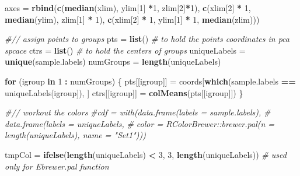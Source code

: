 \documentclass[]{article}
\newenvironment{Shaded}{\begin{snugshade}}{\end{snugshade}}
\newcommand{\KeywordTok}[1]{\textcolor[rgb]{0.13,0.29,0.53}{\textbf{#1}}}
\newcommand{\DecValTok}[1]{\textcolor[rgb]{0.00,0.00,0.81}{#1}}
\newcommand{\StringTok}[1]{\textcolor[rgb]{0.31,0.60,0.02}{#1}}
\newcommand{\CommentTok}[1]{\textcolor[rgb]{0.56,0.35,0.01}{\textit{#1}}}
\newcommand{\ControlFlowTok}[1]{\textcolor[rgb]{0.13,0.29,0.53}{\textbf{#1}}}
\newcommand{\OperatorTok}[1]{\textcolor[rgb]{0.81,0.36,0.00}{\textbf{#1}}}
\newcommand{\NormalTok}[1]{#1}
\begin{document}
\begin{Shaded}
\begin{Highlighting}[]
\NormalTok{       axes                          =}\StringTok{ }\KeywordTok{rbind}\NormalTok{(}\KeywordTok{c}\NormalTok{(}\KeywordTok{median}\NormalTok{(xlim), ylim[}\DecValTok{1}\NormalTok{] }\OperatorTok{*}\DecValTok{1}\NormalTok{, zlim[}\DecValTok{2}\NormalTok{]}\OperatorTok{*}\DecValTok{1}\NormalTok{),}
                                             \KeywordTok{c}\NormalTok{(xlim[}\DecValTok{2}\NormalTok{] }\OperatorTok{*}\StringTok{ }\DecValTok{1}\NormalTok{, }\KeywordTok{median}\NormalTok{(ylim), zlim[}\DecValTok{1}\NormalTok{] }\OperatorTok{*}\StringTok{ }\DecValTok{1}\NormalTok{),}
                                             \KeywordTok{c}\NormalTok{(xlim[}\DecValTok{2}\NormalTok{] }\OperatorTok{*}\StringTok{ }\DecValTok{1}\NormalTok{, ylim[}\DecValTok{1}\NormalTok{] }\OperatorTok{*}\StringTok{ }\DecValTok{1}\NormalTok{, }\KeywordTok{median}\NormalTok{(zlim)))}

       \CommentTok{#// assign points to  groups}
\NormalTok{       pts                           =}\StringTok{ }\KeywordTok{list}\NormalTok{()            }\CommentTok{# to hold the points coordinates in pca spcace}
\NormalTok{       ctrs                          =}\StringTok{ }\KeywordTok{list}\NormalTok{()            }\CommentTok{# to hold the centers of groups}
\NormalTok{       uniqueLabels                  =}\StringTok{ }\KeywordTok{unique}\NormalTok{(sample.labels)}
\NormalTok{       numGroups                     =}\StringTok{ }\KeywordTok{length}\NormalTok{(uniqueLabels)}

       \ControlFlowTok{for}\NormalTok{ (igroup }\ControlFlowTok{in} \DecValTok{1} \OperatorTok{:}\StringTok{ }\NormalTok{numGroups)}
\NormalTok{       \{}
\NormalTok{              pts[[igroup]]       =}\StringTok{ }\NormalTok{coords[}\KeywordTok{which}\NormalTok{(sample.labels }\OperatorTok{==}\StringTok{ }\NormalTok{uniqueLabels[igroup]), ]}
\NormalTok{              ctrs[[igroup]]      =}\StringTok{ }\KeywordTok{colMeans}\NormalTok{(pts[[igroup]])}
\NormalTok{       \}}

       \CommentTok{#// workout the colors}
       \CommentTok{#cdf                         = with(data.frame(labels = sample.labels),}
       \CommentTok{#                                   data.frame(labels = uniqueLabels,}
       \CommentTok{#                                              color = RColorBrewer::brewer.pal(n = length(uniqueLabels), name = "Set1")))}

\NormalTok{       tmpCol                      =}\StringTok{ }\KeywordTok{ifelse}\NormalTok{(}\KeywordTok{length}\NormalTok{(uniqueLabels) }\OperatorTok{<}\StringTok{ }\DecValTok{3}\NormalTok{, }\DecValTok{3}\NormalTok{, }\KeywordTok{length}\NormalTok{(uniqueLabels)) }\CommentTok{# used only for Ebrewer.pal function}


\end{Highlighting}
\end{Shaded}
\end{document}

